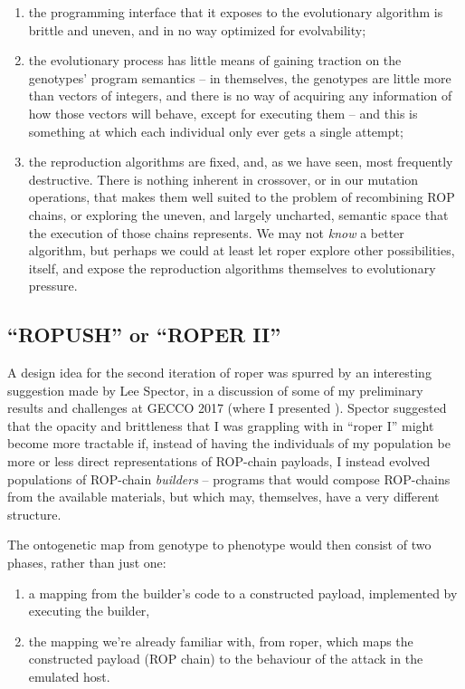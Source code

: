 \documentclass[12pt,glossary]{dalthesis}
\begin{document}
\begin{enumerate}
\item the programming interface that it exposes to the evolutionary
algorithm is brittle and uneven, and in no way optimized for evolvability;

\item the evolutionary process has little means of gaining traction
on the genotypes' program semantics -- in themselves, the genotypes are
little more than vectors of integers, and there is no way of acquiring any
information of how those vectors will behave, except for executing them --
and this is something at which each individual only ever gets a single
attempt;

\item the reproduction algorithms are fixed, and, as we have seen,
most frequently destructive. There is nothing inherent in crossover, or in
our mutation operations, that makes them well suited to the problem of
recombining ROP chains, or exploring the uneven, and largely uncharted,
semantic space that the execution of those chains represents. We may not
\emph{know} a better algorithm, but perhaps we could at least let \gls{roper}
explore other possibilities, itself, and expose the reproduction algorithms
themselves to evolutionary pressure.
\end{enumerate}

\subsection{``ROPUSH'' or ``ROPER II''}
\label{sec:orge95bd5f}

A design idea for the second iteration of \gls{roper} was spurred by an
interesting suggestion made by Lee Spector, in a discussion of some of my
preliminary results and challenges at GECCO 2017 (where I presented \cite{fraser17_gecco}). Spector suggested that the
opacity and brittleness that I was grappling with in ``\gls{roper} I'' might become
more tractable if, instead of having the individuals of my population be more or
less direct representations of ROP-chain payloads, I instead evolved populations
of ROP-chain \emph{builders} -- programs that would compose ROP-chains from the
available materials, but which may, themselves, have a very different structure.

The ontogenetic map from genotype to phenotype would then consist of two phases,
rather than just one:

\begin{enumerate}
\item a mapping from the builder's code to a constructed payload, implemented
by executing the builder,

\item the mapping we're already familiar with, from \gls{roper}, which maps the
constructed payload (ROP chain) to the behaviour of the attack in the
emulated host.
\end{enumerate}
\end{document}
